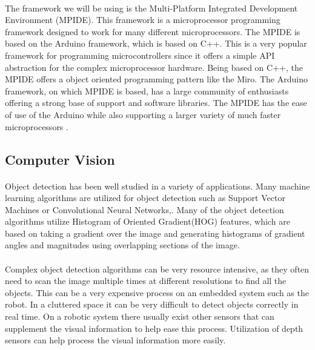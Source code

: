 \documentclass[titlepage,letterpaper,12pt]{article}
\begin{document}
\paragraph{}The framework we will be using is the Multi-Platform Integrated
Development Environment (MPIDE). This framework is a microprocessor programming
framework designed to work for many different microprocessors. The MPIDE is
based on the Arduino framework, which is based on C++. This is a very popular
framework for programming microcontrollers since it offers a simple API
abstraction for the complex microprocessor hardware. Being based on C++, the
MPIDE offers a object oriented programming pattern like the Miro. The Arduino
framework, on which MPIDE is based, has a large community of enthusiasts
offering a strong base of support and software libraries. The MPIDE has the ease
of use of the Arduino while also supporting a larger variety of much faster
microprocessors \cite{anderson2013using}.

\subsection{Computer Vision}
\paragraph{}Object detection has been well studied in a variety of applications.
Many machine learning algorithms are utilized for object detection such as
Support Vector Machines or Convolutional Neural
Networks\cite{Barbu2012},\cite{krizhevsky2012imagenet}. Many of the object
detection algorithms utilize Histogram of Oriented Gradient(HOG) features, which
are based on taking a gradient over the image and generating histograms of
gradient angles and magnitudes using overlapping sections of the
image\cite{Dalal2005}.

\paragraph{}Complex object detection algorithms can be very resource intensive,
as they often need to scan the image multiple times at different resolutions to
find all the objects\cite{Felzenszwalb2013}. This can be a very expensive
process on an embedded system such as the robot. In a cluttered space it can be
very difficult to detect objects correctly in real time. On a robotic system
there usually exist other sensors that can supplement the visual information to
help ease this process. Utilization of depth sensors can help process the visual
information more easily\cite{Gould2008}.
\end{document}

